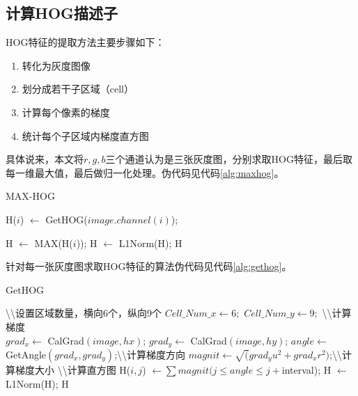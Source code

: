 \subsection{计算HOG描述子}
HOG特征的提取方法主要步骤如下：
\begin{enumerate}
  \item 转化为灰度图像
  \item 划分成若干子区域（cell）
  \item 计算每个像素的梯度
  \item 统计每个子区域内梯度直方图
\end{enumerate}

具体说来，本文将$r,g,b$三个通道认为是三张灰度图，分别求取HOG特征，最后取每一维最大值，最后做归一化处理。伪代码见代码\ref{alg:maxhog}。
\newcommand{\comment}{\textbackslash\textbackslash}
\begin{algorithm}
  \caption{MAX-HOG}\label{alg:maxhog}
  \begin{algorithmic}[1]

        \STATE H($i$) $\leftarrow$ GetHOG($image.channel(i)$);
    \ENDFOR

    \STATE  H $\leftarrow$ MAX(H($i$));
    \STATE  H $\leftarrow$ L1Norm(H);
    \RETURN H
  \end{algorithmic}
\end{algorithm}

针对每一张灰度图求取HOG特征的算法伪代码见代码\ref{alg:gethog}。

\begin{algorithm}
  \caption{GetHOG}\label{alg:gethog}
  \begin{algorithmic}[1]
    \STATE \comment 设置区域数量，横向6个，纵向9个
    \STATE $Cell\_Num\_x \leftarrow 6;$
    \STATE $Cell\_Num\_y \leftarrow 9;$
    \STATE \comment 计算梯度\\
    \STATE $grad_x \leftarrow$ CalGrad$(image,hx)$;
    \STATE $grad_y \leftarrow$ CalGrad$(image,hy)$;
    \STATE $angle \leftarrow$ GetAngle$(grad_x,grad_y)$;\comment 计算梯度方向
    \STATE $magnit \leftarrow \sqrt(grad_yu^2+grad_xr^2)$;\comment 计算梯度大小
    \STATE \comment 计算直方图
            \STATE H($i,j$) $\leftarrow \sum magnit(j \leq angle \leq j+$interval);
        \ENDFOR
    \ENDFOR
    \STATE  H $\leftarrow$ L1Norm(H);
    \RETURN H
  \end{algorithmic}
\end{algorithm}

